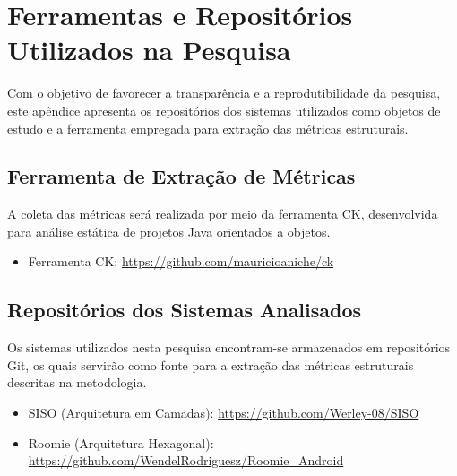 \chapter{Ferramentas e Repositórios Utilizados na Pesquisa}
\label{apendice:A}

Com o objetivo de favorecer a transparência e a reprodutibilidade da pesquisa, este apêndice apresenta os repositórios dos sistemas utilizados como objetos de estudo e a ferramenta empregada para extração das métricas estruturais.

\section{Ferramenta de Extração de Métricas}

A coleta das métricas será realizada por meio da ferramenta CK, desenvolvida para análise estática de projetos Java orientados a objetos.

\begin{itemize}
    \item Ferramenta CK:
    \url{https://github.com/mauricioaniche/ck}
\end{itemize}

\section{Repositórios dos Sistemas Analisados}

Os sistemas utilizados nesta pesquisa encontram-se armazenados em repositórios Git, os quais servirão como fonte para a extração das métricas estruturais descritas na metodologia.

\begin{itemize}
    \item SISO (Arquitetura em Camadas):
    \url{https://github.com/Werley-08/SISO}

    \item Roomie (Arquitetura Hexagonal):
    \url{https://github.com/WendelRodriguesz/Roomie_Android}
\end{itemize}